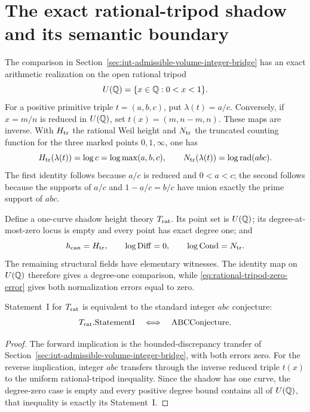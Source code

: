 \section{The exact rational-tripod shadow and its semantic boundary}
\label{sec:iut-rational-tripod-shadow}

The comparison in
Section~\ref{sec:iut-admissible-volume-integer-bridge} has an exact arithmetic
realization on the open rational tripod
\[
                 U(\mathbb Q)=\{x\in\mathbb Q:0<x<1\}.
\]
For a positive primitive triple $t=(a,b,c)$, put $\lambda(t)=a/c$.  Conversely,
if $x=m/n$ is reduced in $U(\mathbb Q)$, set $t(x)=(m,n-m,n)$.  These maps are
inverse.  With $H_{\rm tr}$ the rational Weil height and $N_{\rm tr}$ the
truncated counting function for the three marked points $0,1,\infty$, one has
\begin{equation}\label{eq:rational-tripod-zero-error}
 H_{\rm tr}(\lambda(t))=\log c=\log\max(a,b,c),\qquad
 N_{\rm tr}(\lambda(t))=\log\operatorname{rad}(abc).
\end{equation}
The first identity follows because $a/c$ is reduced and $0<a<c$; the second
follows because the supports of $a/c$ and $1-a/c=b/c$ have union exactly the
prime support of $abc$.

Define a one-curve shadow height theory $T_{\rm rat}$.  Its point set is
$U(\mathbb Q)$; its degree-at-most-zero locus is empty and every point has exact
degree one; and
\[
 h_{\rm can}=H_{\rm tr},\qquad \log\mathrm{Diff}=0,
 \qquad \log\mathrm{Cond}=N_{\rm tr}.
\]
The remaining structural fields have elementary witnesses.  The identity
map on $U(\mathbb Q)$ therefore gives a degree-one comparison, while
\eqref{eq:rational-tripod-zero-error} gives both normalization errors equal
to zero.

\begin{theorem}
\label{thm:rational-tripod-shadow-iff-abc}
Statement~I for $T_{\rm rat}$ is equivalent to the standard integer
$abc$ conjecture:
\[
            T_{\rm rat}.\mathrm{StatementI}
            \quad\Longleftrightarrow\quad
            \mathrm{ABCConjecture}.
\]
\end{theorem}

\begin{proof}
The forward implication is the bounded-discrepancy transfer of
Section~\ref{sec:iut-admissible-volume-integer-bridge}, with both errors zero.
For the reverse implication, integer $abc$ transfers through the inverse
reduced triple $t(x)$ to the uniform rational-tripod inequality.  Since the
shadow has one curve, the degree-zero case is empty and every positive degree
bound contains all of $U(\mathbb Q)$, that inequality is exactly its Statement~I.
\end{proof}

